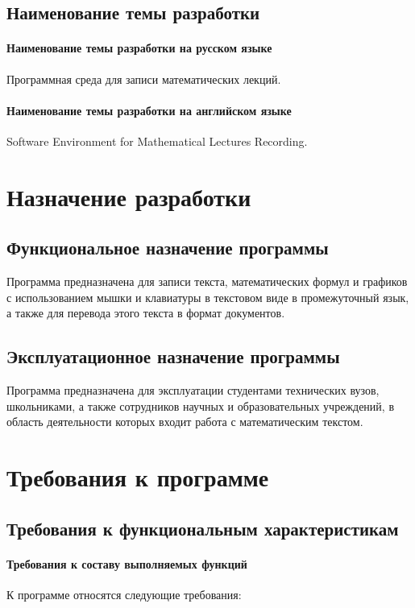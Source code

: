 \documentclass[techtask]{espd}
\begin{document}
\subsection{Наименование темы разработки}
\paragraph{Наименование темы разработки на русском языке}
Программная среда для записи математических лекций.

\paragraph{Наименование темы разработки на английском языке}
Software Environment for Mathematical Lectures Recording.

\section{Назначение разработки}
\subsection{Функциональное назначение программы}
Программа предназначена для записи текста, математических формул и графиков с использованием мышки и клавиатуры в текстовом виде в промежуточный язык, а также для перевода этого текста в формат документов.

\subsection{Эксплуатационное назначение программы}
Программа предназначена для эксплуатации студентами технических вузов, школьниками, а также сотрудников научных и образовательных учреждений, в область деятельности которых входит работа с математическим текстом.

\section{Требования к программе}
\subsection{Требования к функциональным характеристикам}
\paragraph{Требования к составу выполняемых функций}
К программе относятся следующие требования:
\end{document}
